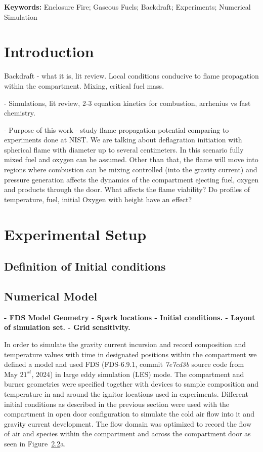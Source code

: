 \documentclass[12pt,letterpaper]{article}
\begin{document}
\begin{flushleft}
\textbf{Keywords:}
Enclosure Fire; Gaseous Fuels; Backdraft; Experiments; Numerical Simulation

\section{Introduction} \addvspace{10pt}
\label{sec:introduction}

Backdraft - what it is, lit review. Local conditions conducive to flame propagation within the compartment. Mixing, critical fuel mass.

- Simulations, lit review, 2-3 equation kinetics for combustion, arrhenius vs fast chemistry.

- Purpose of this work - study flame propagation potential comparing to experiments done at NIST. We are talking about deflagration initiation with spherical flame with diameter up to several centimeters. In this scenario fully mixed fuel and oxygen can be assumed. Other than that, the flame will move into regions where combustion can be mixing controlled (into the gravity current) and pressure generation affects the dynamics of the compartment ejecting fuel, oxygen and products through the door. What affects the flame viability? Do profiles of temperature, fuel, initial Oxygen with height have an effect? 

\section{Experimental Setup} \addvspace{10pt}
\label{sec:expsetup}

\subsection{Definition of Initial conditions} \addvspace{10pt}
\label{sec:initcond}


\subsection{Numerical Model} \addvspace{10pt}
\label{sec:nummodel}

\textbf{- FDS Model Geometry - Spark locations - Initial conditions.
- Layout of simulation set.
- Grid sensitivity.}

In order to simulate the gravity current incursion and record composition and temperature values with time in designated positions within the compartment we defined a model and used FDS (FDS-6.9.1, commit \textit{7e7cd3b} source code from May $21^{st}$, 2024) in large eddy simulation (LES) mode. The compartment and burner geometries were specified together with devices to sample composition and temperature in and around the ignitor locations used in experiments. Different initial conditions as described in the previous section were used with the compartment in open door configuration to simulate the cold air flow into it and gravity current development. The flow domain was optimized to record the flow of air and species within the compartment and across the compartment door as seen in Figure~\ref{}a. 



\end{flushleft}
\end{document}
